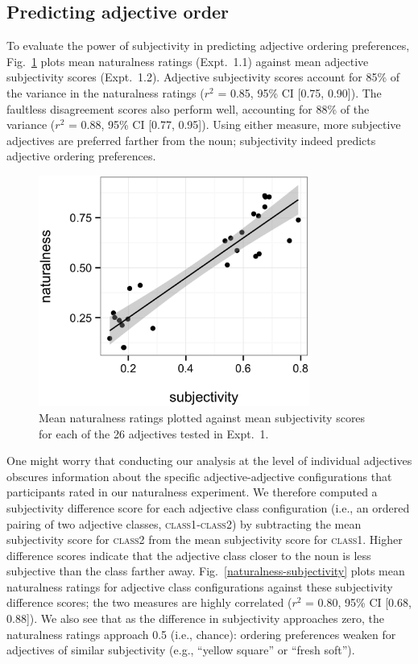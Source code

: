 \documentclass[manuscript]{stjour}
\begin{document}
\subsection{Predicting adjective order}

To evaluate the power of subjectivity in predicting adjective ordering preferences, Fig.~\ref{naturalness-subjectivity-pred} plots mean naturalness ratings (Expt.~1.1) against mean adjective subjectivity scores (Expt.~1.2). Adjective subjectivity scores account for  85\% of the variance in the naturalness ratings ($r^2$ = 0.85, 95\% CI [0.75, 0.90]).
The faultless disagreement scores also perform well, accounting for 88\% of the variance ($r^2$ = 0.88, 95\% CI [0.77, 0.95]).  
Using either measure, more subjective adjectives are preferred farther from the noun; subjectivity indeed predicts adjective ordering preferences.

\begin{figure}
	\centering\includegraphics[width=3.5in]{plots/naturalness-subjectivity-new.eps}
	\caption{Mean naturalness ratings plotted against mean subjectivity scores for each of the 26 adjectives tested in Expt.~1.}\label{naturalness-subjectivity-pred}
\end{figure}

One might worry that conducting our analysis at the level of individual adjectives obscures information about the specific adjective-adjective configurations that participants rated in our naturalness experiment.
We therefore computed a subjectivity difference score for each adjective class configuration (i.e., an ordered pairing of two adjective classes, \textsc{class1}-\textsc{class2}) by subtracting the mean subjectivity score for \textsc{class2} from the mean subjectivity score for \textsc{class1}. Higher difference scores indicate that the adjective class closer to the noun is less subjective than the class farther away. Fig.~\ref{naturalness-subjectivity} plots mean naturalness ratings for adjective class configurations against these subjectivity difference scores; the two measures are highly correlated ($r^2$ = 0.80, 95\% CI [0.68, 0.88]). We also see that as the difference in subjectivity approaches zero, the naturalness ratings approach 0.5 (i.e., chance): ordering preferences weaken for adjectives of similar subjectivity (e.g., ``yellow square'' or ``fresh soft''). %
\end{document}
